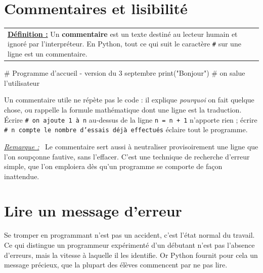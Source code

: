 \documentclass[a4paper,11pt,openany]{book}
\newcommand{\mot}[1]{\textcolor{rougecours}{\textbf{#1}}}
\newcommand{\code}[1]{\texttt{\textcolor{codebleu}{#1}}}
\newenvironment{remarque}%
 {\par\vspace{1mm}\begin{list}{}{\leftmargin=1cm \rightmargin=0.5cm}\item[]%
  \textit{\underline{Remarque :}}~}%
 {\end{list}\vspace{1mm}}
\begin{document}
\section{Commentaires et lisibilité}

\begin{center}
\begin{tabularx}{15cm}{||X}
\noindent \textbf{\underline{Définition :}} Un \mot{commentaire} est un texte destiné au lecteur humain et ignoré par l'interpréteur. En Python, tout ce qui suit le caractère \code{\#} sur une ligne est un commentaire.
\end{tabularx}
\end{center}

\begin{python}
# Programme d'accueil - version du 3 septembre
print("Bonjour")      # on salue l'utilisateur
\end{python}

Un commentaire utile ne répète pas le code : il explique \emph{pourquoi} on fait quelque chose, ou rappelle la formule mathématique dont une ligne est la traduction. Écrire \code{\# on ajoute 1 à n} au-dessus de la ligne \code{n = n + 1} n'apporte rien ; écrire \code{\# n compte le nombre d'essais déjà effectués} éclaire tout le programme.

\begin{remarque}
Le commentaire sert aussi à neutraliser provisoirement une ligne que l'on soupçonne fautive, sans l'effacer. C'est une technique de recherche d'erreur simple, que l'on emploiera dès qu'un programme se comporte de façon inattendue.
\end{remarque}

\section{Lire un message d'erreur}

Se tromper en programmant n'est pas un accident, c'est l'état normal du travail. Ce qui distingue un programmeur expérimenté d'un débutant n'est pas l'absence d'erreurs, mais la vitesse à laquelle il les identifie. Or Python fournit pour cela un message précieux, que la plupart des élèves commencent par ne pas lire.
\end{document}

